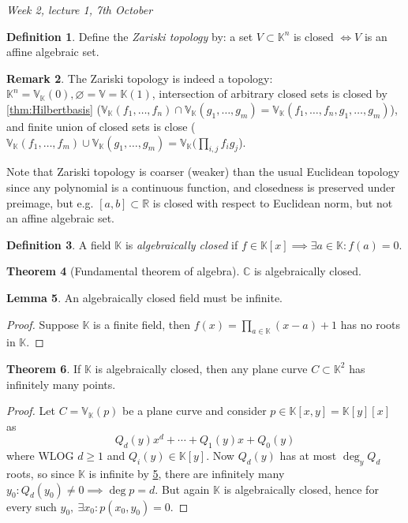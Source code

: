 \documentclass{article}
\newcommand{\R}{\mathbb{R}}
\newcommand{\C}{\mathbb{C}}
\newcommand{\K}{\mathbb{K}}
\newcommand{\V}{\mathbb{V}}
\theoremstyle{definition}
\newtheorem{defn}{Definition}[subsection]
\newtheorem{thm}[defn]{Theorem}
\newtheorem{lemma}[defn]{Lemma}
\newtheorem{remark}[defn]{Remark}
\begin{document}
\begin{flushright}
\textit{Week 2, lecture 1, 7th October}
\end{flushright}

\begin{defn}
Define the \textit{Zariski topology} by: a set $V\subset\K^n$ is closed $\iff V$ is an affine algebraic set.
\end{defn}

\begin{remark}
\label{remark:Zariskitopology}
The Zariski topology is indeed a topology: $\K^n=\V_\K(0),\varnothing=\V=\K(1)$, intersection of arbitrary closed sets is closed by \ref{thm:Hilbertbasis} ($\V_\K(f_1,\ldots,f_n)\cap\V_\K(g_1,\ldots,g_m)=\V_\K(f_1,\ldots,f_n,g_1,\ldots,g_m)$), and finite union of closed sets is close ($\V_\K(f_1,\ldots,f_m)\cup\V_\K(g_1,\ldots,g_m)=\V_\K(\prod_{i,j}f_ig_j$).

Note that Zariski topology is coarser (weaker) than the usual Euclidean topology since any polynomial is a continuous function, and closedness is preserved under preimage, but e.g. $[a,b]\subset\R$ is closed with respect to Euclidean norm, but not an affine algebraic set.
\end{remark}

\begin{defn}
A field $\K$ is \textit{algebraically closed} if $f\in\K[x]\implies \exists a\in\K:f(a)=0$.
\end{defn}

\begin{thm}[Fundamental theorem of algebra]
$\C$ is algebraically closed.
\end{thm}

\begin{lemma}
\label{lemma:algclosedfieldisinfinite}
An algebraically closed field must be infinite.
\end{lemma}
\begin{proof}
Suppose $\K$ is a finite field, then $f(x)=\prod_{a\in\K}(x-a)+1$ has no roots in $\K$.
\end{proof}

\begin{thm}
\label{thm:curveshaveinfpoints}
If $\K$ is algebraically closed, then any plane curve $C\subset\K^2$ has infinitely many points.
\end{thm}
\begin{proof}
Let $C=\V_\K(p)$ be a plane curve and consider $p\in\K[x,y]=\K[y][x]$ as
\[
Q_d(y)x^d+\cdots+Q_1(y)x+Q_0(y)
\]
where WLOG $d\geq 1$ and $Q_i(y)\in\K[y]$. Now $Q_d(y)$ has at most $\deg_y Q_d$ roots, so since $\K$ is infinite by \ref{lemma:algclosedfieldisinfinite}, there are infinitely many $y_0:Q_d(y_0)\neq 0\implies \deg p=d$. But again $\K$ is algebraically closed, hence for every such $y_0,\ \exists x_0:p(x_0,y_0)=0$.
\end{proof}
\end{document}
